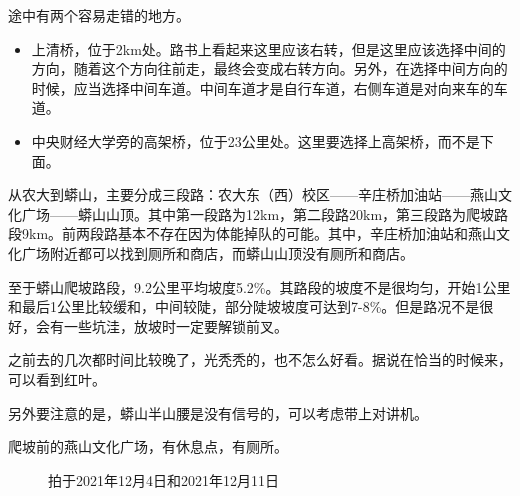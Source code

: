 \documentclass{ctexbook}
\begin{document}
途中有两个容易走错的地方。
\begin{itemize}
    \item 上清桥，位于2km处。路书上看起来这里应该右转，但是这里应该选择中间的方向，随着这个方向往前走，最终会变成右转方向。另外，在选择中间方向的时候，应当选择中间车道。中间车道才是自行车道，右侧车道是对向来车的车道。
    \item 中央财经大学旁的高架桥，位于23公里处。这里要选择上高架桥，而不是下面。
\end{itemize}

从农大到蟒山，主要分成三段路：农大东（西）校区——辛庄桥加油站——燕山文化广场——蟒山山顶。其中第一段路为12km，第二段路20km，第三段路为爬坡路段9km。前两段路基本不存在因为体能掉队的可能。其中，辛庄桥加油站和燕山文化广场附近都可以找到厕所和商店，而蟒山山顶没有厕所和商店。

至于蟒山爬坡路段，9.2公里平均坡度5.2\%。其路段的坡度不是很均匀，开始1公里和最后1公里比较缓和，中间较陡，部分陡坡坡度可达到7-8\%。但是路况不是很好，会有一些坑洼，放坡时一定要解锁前叉。

之前去的几次都时间比较晚了，光秃秃的，也不怎么好看。据说在恰当的时候来，可以看到红叶。

另外要注意的是，蟒山半山腰是没有信号的，可以考虑带上对讲机。

爬坡前的燕山文化广场，有休息点，有厕所。
\begin{figure}[!htb]
    \centering
       \quad 
        \caption{拍于2021年12月4日和2021年12月11日}
  \end{figure}
\end{document}
